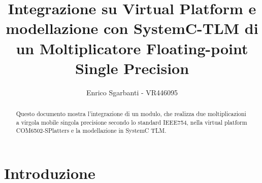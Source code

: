 \documentclass[]{IEEEtran}
\title{Integrazione su Virtual Platform e modellazione con SystemC-TLM di un Moltiplicatore Floating-point Single Precision}
\author{Enrico Sgarbanti - VR446095}
\begin{document}
\maketitle



\begin{abstract}
    Questo documento mostra l'integrazione di un modulo, che realizza due moltiplicazioni a virgola mobile singola precisione secondo lo standard IEEE754\cite{IEEE754}, nella virtual platform COM6502-SPlatters e la modellazione in SystemC\cite{SystemC} TLM.
\end{abstract}



\section{Introduzione}
\end{document}

